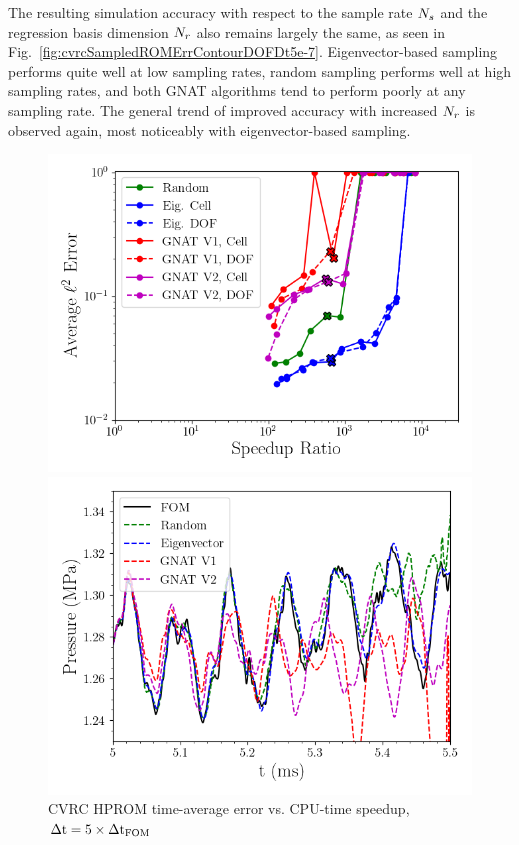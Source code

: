 The resulting simulation accuracy with respect to the sample rate $N_s$ and the regression basis dimension $N_r$ also remains largely the same, as seen in Fig.~\ref{fig:cvrcSampledROMErrContourDOFDt5e-7}. Eigenvector-based sampling performs quite well at low sampling rates, random sampling performs well at high sampling rates, and both GNAT algorithms tend to perform poorly at any sampling rate. The general trend of improved accuracy with increased $N_r$ is observed again, most noticeably with eigenvector-based sampling.

\begin{figure}
	\begin{minipage}{0.49\linewidth}
		\includegraphics[width=0.99\linewidth]{Chapters/HPROMResults/Images/cvrc/dof_samp/sampled_dt5e-7_Average_errorRaw_pareto.png}
		\caption{\label{fig:cvrcSampledROMErrVsTimeDOF}CVRC HPROM time-average error vs. CPU-time speedup, $\Delta \text{t} = 5 \times \Delta \text{t}_{\text{FOM}}$}
	\end{minipage}
	\begin{minipage}{0.49\linewidth}
		\includegraphics[width=0.99\linewidth]{Chapters/HPROMResults/Images/cvrc/dof_samp/pressure_probe_deim_dof_dt5e-7_samp0p0025.png}

\end{minipage}
\end{figure}
